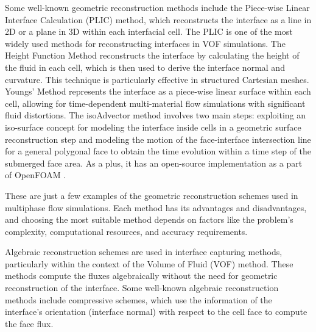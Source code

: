 Some well-known geometric reconstruction methods include the Piece-wise Linear Interface Calculation (\ac{PLIC}) \cite{huang2012piecewise} method, which reconstructs the interface as a line in 2D or a plane in 3D within each interfacial cell. The PLIC is one of the most widely used methods for reconstructing interfaces in VOF simulations. The Height Function Method \cite{height-function} reconstructs the interface by calculating the height of the fluid in each cell, which is then used to derive the interface normal and curvature. This technique is particularly effective in structured Cartesian meshes. Youngs' Method \cite{youngs-method} represents the interface as a piece-wise linear surface within each cell, allowing for time-dependent multi-material flow simulations with significant fluid distortions. The isoAdvector \cite{roenby2019isoadvector} method involves two main steps: exploiting an iso-surface concept for modeling the interface inside cells in a geometric surface reconstruction step and modeling the motion of the face-interface intersection line for a general polygonal face to obtain the time evolution within a time step of the submerged face area. As a plus, it has an open-source implementation as a part of OpenFOAM \cite{jasak2007openfoam}.

These are just a few examples of the geometric reconstruction schemes used in multiphase flow simulations. Each method has its advantages and disadvantages, and choosing the most suitable method depends on factors like the problem's complexity, computational resources, and accuracy requirements.

Algebraic reconstruction schemes are used in interface capturing methods, particularly within the context of the Volume of Fluid (VOF) method. These methods compute the fluxes algebraically without the need for geometric reconstruction of the interface. Some well-known algebraic reconstruction methods include compressive schemes, which use the information of the interface's orientation (interface normal) with respect to the cell face to compute the face flux. 

